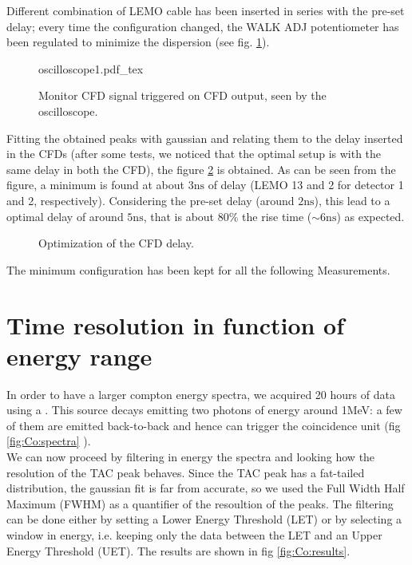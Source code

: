 \documentclass[11pt,a4 paper]{article}
\begin{document}
Different combination of LEMO cable has been inserted in series with the pre-set delay; every time the configuration changed, the WALK ADJ potentiometer has been regulated to minimize the dispersion (see fig. \ref{fig:oscilloscope}).

\begin{figure}[H]
    \centering
    \def\svgwidth{0.7\textwidth}{oscilloscope1.pdf_tex}
    \caption{Monitor CFD signal triggered on CFD output, seen by the oscilloscope.}
    \label{fig:oscilloscope}
\end{figure}


Fitting the obtained peaks with gaussian and relating them to the delay inserted in the CFDs (after some tests, we noticed that the optimal setup is with the same delay in both the CFD), the figure \ref{fig:CFD:delay} is obtained. As can be seen from the figure, a minimum is found at about $3\si{\nano\second}$ of delay (LEMO 13 and 2 for detector 1 and 2, respectively). Considering the pre-set delay (around $2\si{\nano\second}$), this lead to a optimal delay of around $5\si{\nano\second}$, that is about $80\%$ the rise time ($\sim6\si{\nano\second}$) as expected.

\begin{figure}[H]
    \centering
    \caption{Optimization of the CFD delay.}
    \label{fig:CFD:delay}
\end{figure}

The minimum configuration has been kept for all the following Measurements.

\section{Time resolution in function of energy range}
In order to have a larger compton energy spectra, we acquired 20 hours of data using a . This source decays emitting two photons of energy around 1\si{\mega\electronvolt}: a few of them are emitted back-to-back and hence can trigger the coincidence unit (fig \ref{fig:Co:spectra} ).\\
We can now proceed by filtering in energy the spectra and looking how the resolution of the TAC peak behaves. Since the TAC peak has a fat-tailed distribution, the gaussian fit is far from accurate, so we used the Full Width Half Maximum (FWHM) as a quantifier of the resoultion of the peaks.
The filtering can be done either by setting a Lower Energy Threshold (LET) or by selecting a window in energy, i.e. keeping only the data between the LET and an Upper Energy Threshold (UET). The results are shown in fig \ref{fig:Co:results}.
\end{document}
